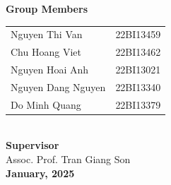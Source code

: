 \begin{titlepage}
\begin{center}
{\begin{minipage}[c][0.98\textheight][c]{0.98\textwidth}
                \textbf{\large Group Members} \\[10pt]
                \begin{tabular}{l@{\hskip 3cm}l} %
                Nguyen Thi Van    & 22BI13459 \\
                Chu Hoang Viet     & 22BI13462 \\
                Nguyen Hoai Anh        & 22BI13021 \\
                Nguyen Dang Nguyen & 22BI13340 \\
                Do Minh Quang           & 22BI13379 \\
                \end{tabular} \\[20pt]
            
                \textbf{\large Supervisor} \\[3pt]
                Assoc. Prof. Tran Giang Son \\[20pt]
            
                \textbf{January, 2025}
            \end{minipage}
        }
    \end{center}
    \endgroup %
\end{titlepage}

\restoregeometry

\thispagestyle{empty}

\newpage
